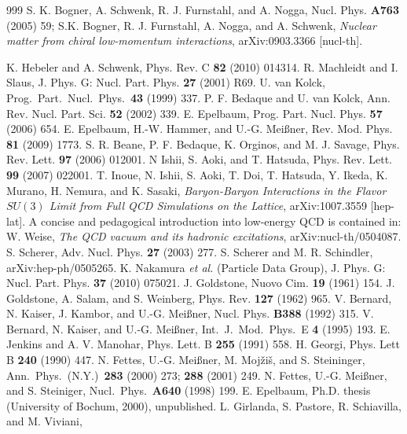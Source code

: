 \documentclass[sort&compress,preprint,3p]{elsarticle}
\begin{document}
\begin{thebibliography}{999}
S. K. Bogner, A. Schwenk, R. J. Furnstahl, and A. Nogga, 
Nucl. Phys. {\bf A763} (2005) 59;
S.K. Bogner, R. J. Furnstahl, A. Nogga, and A. Schwenk, 
{\it Nuclear matter from chiral low-momentum interactions},
arXiv:0903.3366 [nucl-th].

K. Hebeler and A. Schwenk,
Phys. Rev. C {\bf 82} (2010) 014314.
R. Machleidt and I. Slaus, J. Phys. G: Nucl. Part. Phys. {\bf 27} (2001) R69.
 U. van Kolck, Prog.\ Part.\ Nucl.\ Phys.\ 
{\bf 43} (1999) 337.
 P. F. Bedaque and U. van Kolck,
Ann. Rev. Nucl. Part. Sci. {\bf 52} (2002) 339.
 E. Epelbaum,
Prog. Part. Nucl. Phys. {\bf 57} (2006) 654.
E. Epelbaum, H.-W. Hammer, and U.-G. Mei\ss ner,
Rev. Mod. Phys. {\bf 81} (2009) 1773.
S. R. Beane, P. F. Bedaque, K. Orginos, and M. J. Savage,
Phys. Rev. Lett. {\bf 97} (2006) 012001.
N Ishii, S. Aoki, and T. Hatsuda,
Phys. Rev. Lett. {\bf 99} (2007) 022001.
T. Inoue, N. Ishii, S. Aoki, T. Doi, T. Hatsuda, Y. Ikeda, K. Murano, H. Nemura, and K. Sasaki,
{\it Baryon-Baryon Interactions in the Flavor $SU(3)$ Limit from Full QCD Simulations on the Lattice},
arXiv:1007.3559 [hep-lat].
A concise and pedagogical introduction
into low-energy QCD is contained in:
W. Weise, {\it The QCD vacuum and its hadronic excitations},
arXiv:nucl-th/0504087.
S. Scherer, Adv. Nucl. Phys. {\bf 27} (2003) 277. 
S. Scherer and M. R. Schindler, arXiv:hep-ph/0505265.
 K. Nakamura {\it et al.} (Particle Data Group), 
J. Phys. G: Nucl. Part. Phys. {\bf 37} (2010) 075021.
J. Goldstone, Nuovo Cim. {\bf 19} (1961) 154.
J. Goldstone, A. Salam, and S. Weinberg, Phys. Rev. {\bf 127} (1962) 965.
\bibitem{Ber92} V. Bernard, N. Kaiser, J. Kambor, and U.-G. Mei\ss ner,
Nucl. Phys. {\bf B388} (1992) 315.
 V. Bernard, N. Kaiser, and U.-G. Mei\ss ner,
Int.\ J.\ Mod.\ Phys.\ E {\bf 4} (1995) 193.
 E. Jenkins and A. V. Manohar,
Phys. Lett. B {\bf 255} (1991) 558.
 H. Georgi, Phys. Lett B {\bf 240} (1990) 447. 
 N. Fettes, U.-G. Mei\ss ner, M. Moj\v{z}i\v{s}, 
and S. Steininger, Ann.\ Phys.\ (N.Y.)\ {\bf 283} (2000) 273;
{\bf 288} (2001) 249.
 N. Fettes, U.-G. Mei\ss ner, and S. Steiniger,
Nucl.\ Phys.\ {\bf A640} (1998) 199.
E. Epelbaum, Ph.D. thesis (University of Bochum, 2000), unpublished.
\bibitem{Gir10}
L. Girlanda, S. Pastore, R. Schiavilla, and M. Viviani,

\end{thebibliography}
\end{document}
